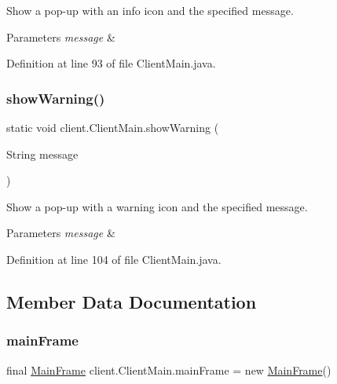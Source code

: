 Show a pop-\/up with an info icon and the specified message.


\begin{DoxyParams}{Parameters}
{\em message} & \\
\hline
\end{DoxyParams}


Definition at line 93 of file Client\+Main.\+java.

\hypertarget{classclient_1_1_client_main_a0964644423f3d533ca394456ee6f6c95}{}\label{classclient_1_1_client_main_a0964644423f3d533ca394456ee6f6c95} 
\subsubsection{\texorpdfstring{show\+Warning()}{showWarning()}}
{\footnotesize\ttfamily static void client.\+Client\+Main.\+show\+Warning (\begin{DoxyParamCaption}\item[{String}]{message }\end{DoxyParamCaption})\hspace{0.3cm}{\ttfamily [static]}}

Show a pop-\/up with a warning icon and the specified message.


\begin{DoxyParams}{Parameters}
{\em message} & \\
\hline
\end{DoxyParams}


Definition at line 104 of file Client\+Main.\+java.



\subsection{Member Data Documentation}
\hypertarget{classclient_1_1_client_main_ab0ba57ef294e065b9140994413a5d705}{}\label{classclient_1_1_client_main_ab0ba57ef294e065b9140994413a5d705} 
\subsubsection{\texorpdfstring{main\+Frame}{mainFrame}}
{\footnotesize\ttfamily final \hyperlink{classclient_1_1ui_1_1_main_frame}{Main\+Frame} client.\+Client\+Main.\+main\+Frame = new \hyperlink{classclient_1_1ui_1_1_main_frame}{Main\+Frame}()\hspace{0.3cm}{\ttfamily [static]}}




